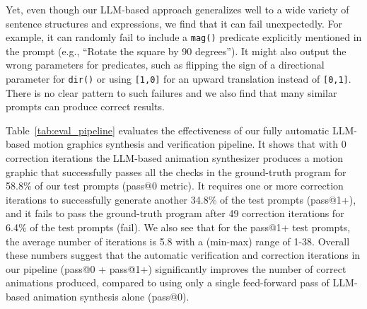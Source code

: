 Yet, even though our LLM-based approach generalizes well to a wide
variety of sentence structures and expressions, we find that it can
fail unexpectedly.  For example, it can randomly fail to include a
\texttt{mag()} predicate explicitly mentioned in the prompt (e.g., ``Rotate the square by 90 degrees'').
It might also output the wrong parameters for predicates,
such as flipping the sign of a directional parameter for \texttt{dir()}
or using \texttt{[1,0]} for an upward translation instead of
\texttt{[0,1]}.
%
There is no clear pattern to such failures and we also find that many 
similar prompts can produce correct results.
%
%
%




\vspace{0.5em}
Table~\ref{tab:eval_pipeline} evaluates the effectiveness of
our fully automatic LLM-based motion graphics synthesis and verification
pipeline.
%
It shows that with 0 correction iterations the LLM-based animation
synthesizer produces a motion graphic that successfully passes all the
checks in the ground-truth \dslname{} program for 58.8\% of our test
prompts (pass@0 metric).  It requires one or more correction
iterations to successfully generate another 34.8\% of the test prompts
(pass@1+), and it fails to pass the ground-truth \dslname{} program
after 49 correction iterations for 6.4\% of the test prompts (fail).
We also see that for the pass@1+ test prompts, the average number of
iterations is 5.8 with a (min-max) range of 1-38.
%
Overall these numbers suggest that the automatic verification
and correction iterations in our pipeline (pass@0 + pass@1+)
significantly improves the number of correct animations produced,
compared to using only a single feed-forward pass of LLM-based
animation synthesis alone (pass@0). 


